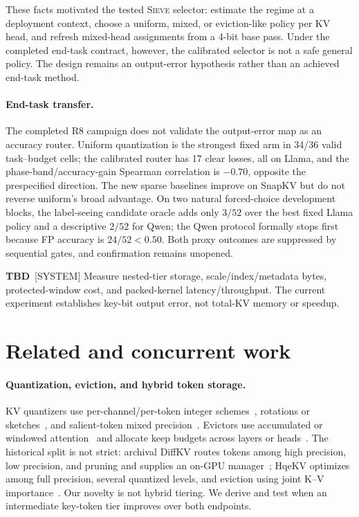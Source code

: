 \documentclass{article}
\newcommand{\tbd}[1]{{\color{tbdcol}\textbf{TBD}~#1}}
\newcommand{\sieve}{\textsc{Sieve}}
\theoremstyle{definition}
\begin{document}
These facts motivated the tested \sieve{} selector: estimate the regime at a deployment context, choose a uniform, mixed, or eviction-like policy per KV head, and refresh mixed-head assignments from a 4-bit base pass.  Under the completed end-task contract, however, the calibrated selector is not a safe general policy.  The design remains an output-error hypothesis rather than an achieved end-task method.

\paragraph{End-task transfer.}
The completed R8 campaign does not validate the output-error map as an accuracy router.  Uniform quantization is the strongest fixed arm in 34/36 valid task--budget cells; the calibrated router has 17 clear losses, all on Llama, and the phase-band/accuracy-gain Spearman correlation is $-0.70$, opposite the prespecified direction.  The new sparse baselines improve on SnapKV but do not reverse uniform's broad advantage.  On two natural forced-choice development blocks, the label-seeing candidate oracle adds only $3/52$ over the best fixed Llama policy and a descriptive $2/52$ for Qwen; the Qwen protocol formally stops first because FP accuracy is $24/52<0.50$.  Both proxy outcomes are suppressed by sequential gates, and confirmation remains unopened.

\tbd{[SYSTEM] Measure nested-tier storage, scale/index/metadata bytes, protected-window cost, and packed-kernel latency/throughput. The current experiment establishes key-bit output error, not total-KV memory or speedup.}

\section{Related and concurrent work}
\label{sec:related}

\paragraph{Quantization, eviction, and hybrid token storage.}
KV quantizers use per-channel/per-token integer schemes~\citep{liu2024kivi,hooper2024kvquant}, rotations or sketches~\citep{zandieh2025turboquant,zandieh2024qjl}, and salient-token mixed precision~\citep{yang2024mikv,he2024zipcache}.  Evictors use accumulated or windowed attention~\citep{zhang2023h2o,li2024snapkv,liu2023scissorhands,xiao2024streamingllm} and allocate keep budgets across layers or heads~\citep{cai2024pyramidkv,feng2024adakv}.  The historical split is not strict: archival DiffKV routes tokens among high precision, low precision, and pruning and supplies an on-GPU manager~\citep{zhang2025diffkv}; HqeKV optimizes among full precision, several quantized levels, and eviction using joint K--V importance~\citep{wang-etal-2026-hqekv}.  Our novelty is not hybrid tiering.  We derive and test when an intermediate key-token tier improves over both endpoints.
\end{document}
